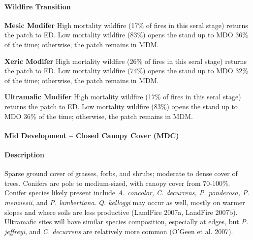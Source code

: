 \paragraph{Wildfire Transition}
\begin{adjustwidth}{2cm}{}
\textbf{Mesic Modifer } High mortality wildfire (17\% of fires in this seral stage) returns the patch to ED. Low mortality wildfire (83\%) opens the stand up to MDO 36\% of the time; otherwise, the patch remains in MDM. 

\textbf{Xeric Modifer}  High mortality wildfire (26\% of fires in this seral stage) returns the patch to ED. Low mortality wildfire (74\%) opens the stand up to MDO 32\% of the time; otherwise, the patch remains in MDM.

\textbf{Ultramafic Modifer} High mortality wildfire (17\% of fires in this seral stage) returns the patch to ED. Low mortality wildfire (83\%) opens the stand up to MDO 36\% of the time; otherwise, the patch remains in MDM.

\end{adjustwidth}

\noindent\hrulefill

\paragraph{Mid Development – Closed Canopy Cover (MDC)}

\paragraph{Description} Sparse ground cover of grasses, forbs, and shrubs; moderate to dense cover of trees. Conifers are pole to medium-sized, with canopy cover from 70-100\%. Conifer species likely present include \emph{A. concolor, C. decurrens, P. ponderosa, P. menziesii}, and \emph{P. lambertiana}. \emph{Q. kelloggi} may occur as well, mostly on warmer slopes and where soils are less productive (LandFire 2007a, LandFire 2007b). Ultramafic sites will have similar species composition, especially at edges, but \emph{P. jeffreyi}, and \emph{C. decurrens} are relatively more common (O’Geen et al. 2007).

